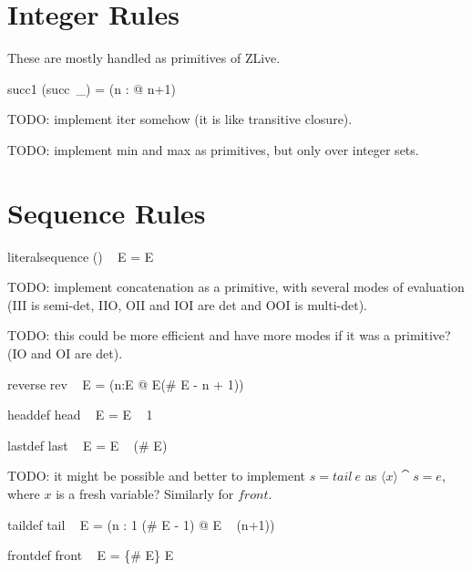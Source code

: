 \documentclass{article}
\begin{document}
\section{Integer Rules}

These are mostly handled as primitives of ZLive.


\begin{zedrule}{succ1}
  (succ~\_) = (\lambda n : \nat @ n+1)
\end{zedrule}

TODO: implement iter somehow (it is like transitive closure).

TODO: implement min and max as primitives, but only over integer sets.


\section{Sequence Rules}

\begin{zedrule}{literalsequence}
   (\langle \listarg \rangle) ~ E = E
\end{zedrule}

TODO: implement concatenation as a primitive, with several
modes of evaluation (III is semi-det, IIO, OII and IOI are det
and OOI is multi-det).

TODO: this could be more efficient and have more modes if it
was a primitive? (IO and OI are det).
\begin{zedrule}{reverse}
   rev ~ E = (\lambda n:\dom E @ E(\# E - n + 1))
\end{zedrule}

\begin{zedrule}{headdef}
   head ~ E = E ~ 1
\end{zedrule}

\begin{zedrule}{lastdef}
   last ~ E = E ~ (\# E)
\end{zedrule}

TODO: it might be possible and better to implement $s=tail~e$
as $\langle x \rangle \cat s = e$, where $x$ is a fresh variable?
Similarly for $front$.
\begin{zedrule}{taildef}
   tail ~ E = (\lambda n : 1 \upto (\# E - 1) @ E ~ (n+1))
\end{zedrule}

\begin{zedrule}{frontdef}
   front ~ E = \{\# E\} \ndres E
\end{zedrule}
\end{document}
